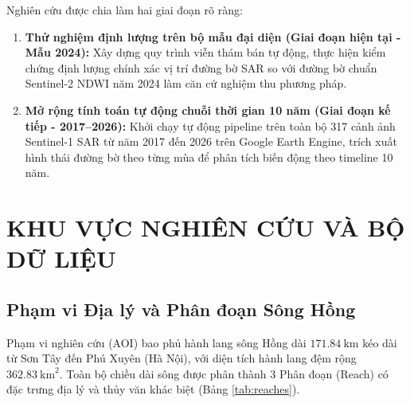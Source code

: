 \documentclass[11pt,a4paper]{article}
\begin{document}
Nghiên cứu được chia làm hai giai đoạn rõ ràng:
\begin{enumerate}
    \item \textbf{Thử nghiệm định lượng trên bộ mẫu đại diện (Giai đoạn hiện tại - Mẫu 2024):} Xây dựng quy trình viễn thám bán tự động, thực hiện kiểm chứng định lượng chính xác vị trí đường bờ SAR so với đường bờ chuẩn Sentinel-2 NDWI năm 2024 làm căn cứ nghiệm thu phương pháp.
    \item \textbf{Mở rộng tính toán tự động chuỗi thời gian 10 năm (Giai đoạn kế tiếp - 2017--2026):} Khởi chạy tự động pipeline trên toàn bộ 317 cảnh ảnh Sentinel-1 SAR từ năm 2017 đến 2026 trên Google Earth Engine, trích xuất hình thái đường bờ theo từng mùa để phân tích biến động theo timeline 10 năm.
\end{enumerate}

\section{KHU VỰC NGHIÊN CỨU VÀ BỘ DỮ LIỆU}

\subsection{Phạm vi Địa lý và Phân đoạn Sông Hồng}
Phạm vi nghiên cứu (AOI) bao phủ hành lang sông Hồng dài $171.84~\text{km}$ kéo dài từ Sơn Tây đến Phú Xuyên (Hà Nội), với diện tích hành lang đệm rộng $362.83~\text{km}^2$. Toàn bộ chiều dài sông được phân thành 3 Phân đoạn (Reach) có đặc trưng địa lý và thủy văn khác biệt (Bảng \ref{tab:reaches}).

\begin{table}[H]
\centering
\caption{Đặc điểm các phân đoạn sông Hồng thuộc phạm vi nghiên cứu.}
\label{tab:reaches}
\end{table}
\end{document}

